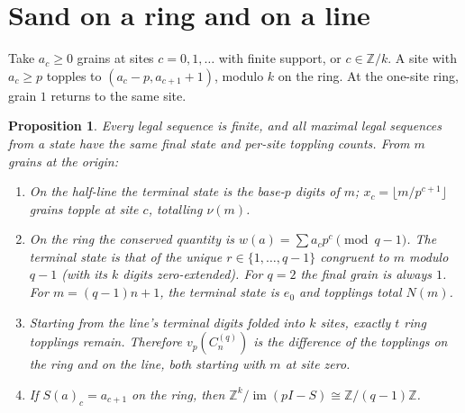 \documentclass[10pt]{article}
\newtheorem{proposition}{Proposition}
\theoremstyle{definition}\newtheorem*{definition}{Definition}
\theoremstyle{remark}\newtheorem*{remark}{Remark}
\begin{document}
\section{Sand on a ring and on a line}
Take $a_c\ge0$ grains at sites $c=0,1,\ldots$ with finite support, or $c\in
\mathbb Z/k$. A site with $a_c\ge p$ topples to $(a_c-p,a_{c+1}+1)$, modulo $k$
on the ring. At the one-site ring, grain $1$ returns to the same site.
\begin{proposition}\label{sand} Every legal sequence is finite, and all maximal
legal sequences from a state have the same final state and per-site toppling
counts. From $m$ grains at the origin:
\begin{enumerate}
\item On the half-line the terminal state is the base-$p$ digits of $m$;
$x_c=\lfloor m/p^{c+1}\rfloor$ grains topple at site $c$, totalling $\nu(m)$.
\item On the ring the conserved quantity is $w(a)=\sum a_cp^c\pmod{q-1}$. The
terminal state is that of the unique $r\in\{1,\ldots,q-1\}$ congruent to $m$
modulo $q-1$ (with its $k$ digits zero-extended). For $q=2$ the final grain is
always $1$. For $m=(q-1)n+1$, the terminal state is $e_0$ and topplings total
$N(m)$.
\item Starting from the line's terminal digits folded into $k$ sites, exactly
$t$ ring topplings remain. Therefore $v_p(C_n^{(q)})$ is the difference of the
topplings on the ring and on the line, both starting with $m$ at site zero.
\item If $S(a)_c=a_{c+1}$ on the ring, then $\mathbb Z^k/\operatorname{im}(pI-S)
\cong\mathbb Z/(q-1)\mathbb Z$.
\end{enumerate}\end{proposition}
\end{document}
